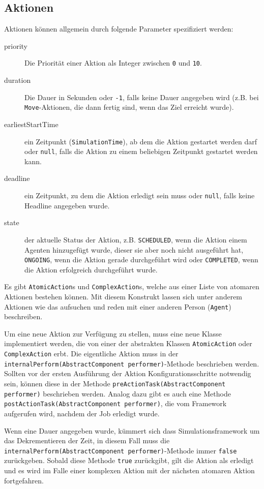 \subsection{Aktionen}\label{subsec:concept_actions}
Aktionen können allgemein durch folgende Parameter spezifiziert werden:
\begin{description}
	\item[priority] Die Priorität einer Aktion als Integer zwischen \texttt{0} und \texttt{10}.
	\item[duration] Die Dauer in Sekunden oder \texttt{-1}, falls keine Dauer angegeben wird (z.B. bei \texttt{Move}-Aktionen, die dann fertig sind, wenn das Ziel erreicht wurde).
	\item[earliestStartTime] ein Zeitpunkt (\texttt{SimulationTime}), ab dem die Aktion gestartet werden darf oder \texttt{null}, falls die Aktion zu einem beliebigen Zeitpunkt gestartet werden kann.
	\item[deadline] ein Zeitpunkt, zu dem die Aktion erledigt sein muss oder \texttt{null}, falls keine Headline angegeben wurde.
	\item[state] der aktuelle Status der Aktion, z.B. \texttt{SCHEDULED}, wenn die Aktion einem Agenten hinzugefügt wurde, dieser sie aber noch nicht ausgeführt hat, \texttt{ONGOING}, wenn die Aktion gerade durchgeführt wird oder \texttt{COMPLETED}, wenn die Aktion erfolgreich durchgeführt wurde.
\end{description}
Es gibt \texttt{AtomicAction}s und \texttt{ComplexAction}s, welche aus einer Liste von atomaren Aktionen bestehen können. Mit diesem Konstrukt lassen sich unter anderem Aktionen wie das aufsuchen und reden mit einer anderen Person (\texttt{Agent}) beschreiben.

Um eine neue Aktion zur Verfügung zu stellen, muss eine neue Klasse implementiert werden, die von einer der abstrakten Klassen \texttt{AtomicAction} oder \texttt{ComplexAction} erbt. Die eigentliche Aktion muss in der \texttt{internalPerform(AbstractComponent performer)}-Methode beschrieben werden. Sollten vor der ersten Ausführung der Aktion Konfigurationsschritte notwendig sein, können diese in der Methode \texttt{preActionTask(AbstractComponent performer)} beschrieben werden. Analog dazu gibt es auch eine Methode \texttt{postActionTask(AbstractComponent performer)}, die vom Framework aufgerufen wird, nachdem der Job erledigt wurde.

Wenn eine Dauer angegeben wurde, kümmert sich dass Simulationsframework um das Dekrementieren der Zeit, in diesem Fall muss die \texttt{internalPerform(AbstractComponent performer)}-Methode immer \texttt{false} zurückgeben. Sobald diese Methode \texttt{true} zurückgibt, gilt die Aktion als erledigt und es wird im Falle einer komplexen Aktion mit der nächsten atomaren Aktion fortgefahren.

